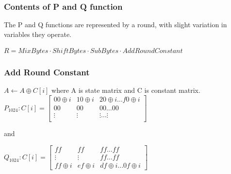 \documentclass{beamer}
\begin{document}
\begin{frame}
\frametitle{Contents of P and Q function}
The P and Q functions are represented by a round, with slight variation in variables they operate.
\begin{center}$ R = MixBytes \cdot ShiftBytes \cdot SubBytes \cdot AddRoundConstant $ \end{center}
\end{frame}

\begin{frame}
\frametitle{Add Round Constant}
$A \gets A \oplus C[i]$ where A is state matrix and C is constant matrix.
$ P_{1024}: C[i] = \begin{bmatrix}
  00 \oplus i & 10 \oplus i & 20 \oplus i \ldots f0 \oplus i \\
  00          & 00          & 00          \dots  00          \\
  \vdots      & \vdots      & \vdots      \dots  \vdots      \\
\end{bmatrix}$

and 

$Q_{1024}: C[i] = \begin{bmatrix}
  ff          & ff          & ff          \dots ff          \\
  \vdots      & \vdots      & ff          \dots ff          \\
  ff \oplus i & ef \oplus i & df \oplus i \dots 0f \oplus i
\end{bmatrix}$
\end{frame}
\end{document}
